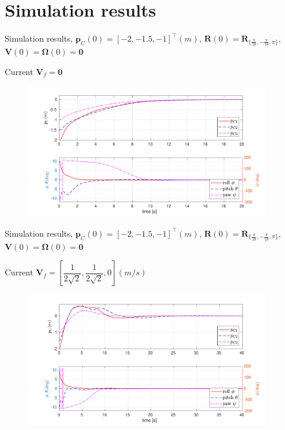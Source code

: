 \documentclass{beamer}
\begin{document}
\section{Simulation results}
\begin{frame}{Simulation results, \tiny$\mathbf{p}_C(0) = [-2, -1.5, -1 ]^{\top} (m)$, $\mathbf{R}(0) = \mathbf{R}_{\{\frac{\pi}{18},-\frac{\pi}{18},\pi\}}$, $\mathbf{V}(0) = \mathbf{\Omega}(0) = \mathbf{0}$}

\begin{block}{Current $\mathbf{V}_f = \mathbf{0}$}
	\begin{figure}
		\includegraphics[width = 105mm]{Images/Data_sansCurrent_pos_RollPitch_Yaw2.pdf}
	\end{figure}
\end{block}
\end{frame}

\begin{frame}{Simulation results, \tiny$\mathbf{p}_C(0) = [-2, -1.5, -1 ]^{\top} (m)$, $\mathbf{R}(0) = \mathbf{R}_{\{\frac{\pi}{18},-\frac{\pi}{18},\pi\}}$, $\mathbf{V}(0) = \mathbf{\Omega}(0) = \mathbf{0}$}

\begin{block}{Current $\mathbf{V}_f = [\dfrac{1}{2\sqrt{2}}, \dfrac{1}{2\sqrt{2}}, 0] (m/s)$}
	\begin{figure}
		\includegraphics[width = 105mm]{Images/Data_avecCurrent_pos_RollPitch_Yaw2.pdf}	
	\end{figure}
\end{block}
\end{frame}
\end{document}
